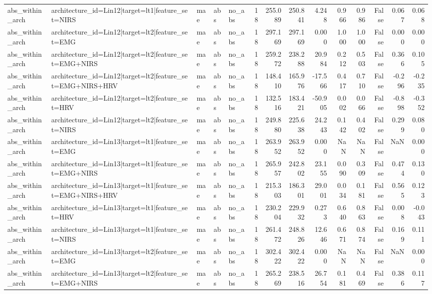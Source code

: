 \begin{table}
\begin{tabular}{lllllrrrrrrrrr}
abs_within_arch & architecture_id=Lin12|target=lt1|feature_set=NIRS & mae & abs & no_abs & 18 & 255.089 & 250.841 & 4.248 & 0.966 & 0.986 & False & 0.067 & 0.068 \\
abs_within_arch & architecture_id=Lin12|target=lt2|feature_set=EMG & mae & abs & no_abs & 18 & 297.169 & 297.169 & 0.000 & 1.000 & 1.000 & False & 0.000 & 0.000 \\
abs_within_arch & architecture_id=Lin12|target=lt2|feature_set=EMG+NIRS & mae & abs & no_abs & 18 & 259.272 & 238.288 & 20.984 & 0.212 & 0.503 & False & 0.366 & 0.105 \\
abs_within_arch & architecture_id=Lin12|target=lt2|feature_set=EMG+NIRS+HRV & mae & abs & no_abs & 18 & 148.410 & 165.976 & -17.566 & 0.417 & 0.710 & False & -0.296 & -0.235 \\
abs_within_arch & architecture_id=Lin12|target=lt2|feature_set=HRV & mae & abs & no_abs & 18 & 132.516 & 183.421 & -50.905 & 0.002 & 0.066 & False & -0.898 & -0.352 \\
abs_within_arch & architecture_id=Lin12|target=lt2|feature_set=NIRS & mae & abs & no_abs & 18 & 249.880 & 225.638 & 24.243 & 0.142 & 0.402 & False & 0.299 & 0.080 \\
abs_within_arch & architecture_id=Lin13|target=lt1|feature_set=EMG & mae & abs & no_abs & 18 & 263.952 & 263.952 & 0.000 & NaN & NaN & False & NaN & 0.000 \\
abs_within_arch & architecture_id=Lin13|target=lt1|feature_set=EMG+NIRS & mae & abs & no_abs & 18 & 265.957 & 242.802 & 23.155 & 0.090 & 0.309 & False & 0.474 & 0.130 \\
abs_within_arch & architecture_id=Lin13|target=lt1|feature_set=EMG+NIRS+HRV & mae & abs & no_abs & 18 & 215.303 & 186.301 & 29.001 & 0.034 & 0.181 & False & 0.565 & 0.123 \\
abs_within_arch & architecture_id=Lin13|target=lt1|feature_set=HRV & mae & abs & no_abs & 18 & 230.204 & 229.932 & 0.273 & 0.640 & 0.863 & False & 0.008 & -0.043 \\
abs_within_arch & architecture_id=Lin13|target=lt1|feature_set=NIRS & mae & abs & no_abs & 18 & 261.472 & 248.826 & 12.646 & 0.671 & 0.874 & False & 0.169 & 0.111 \\
abs_within_arch & architecture_id=Lin13|target=lt2|feature_set=EMG & mae & abs & no_abs & 18 & 302.422 & 302.422 & 0.000 & NaN & NaN & False & NaN & 0.000 \\
abs_within_arch & architecture_id=Lin13|target=lt2|feature_set=EMG+NIRS & mae & abs & no_abs & 18 & 265.269 & 238.516 & 26.754 & 0.181 & 0.469 & False & 0.386 & 0.117 \\

\end{tabular}
\end{table}
